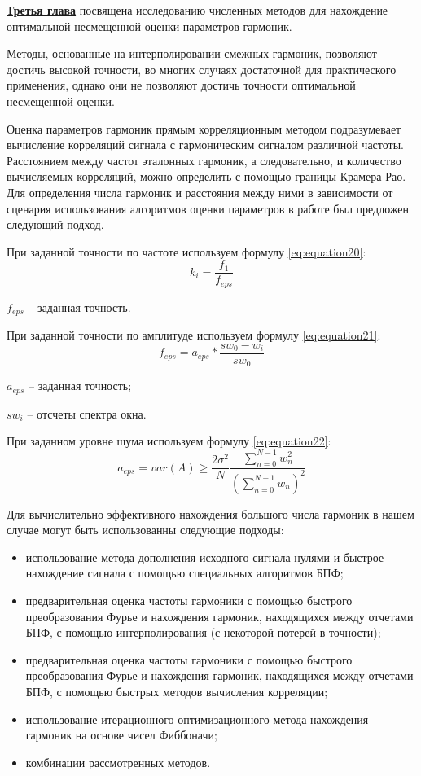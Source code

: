 \underline{\textbf{Третья глава}} посвящена исследованию численных методов для нахождение оптимальной несмещенной оценки параметров гармоник.

Методы, основанные на интерполировании смежных гармоник, позволяют достичь высокой точности, во многих случаях достаточной для практического применения, однако они не позволяют достичь точности оптимальной несмещенной оценки.

Оценка параметров гармоник прямым корреляционным методом подразумевает вычисление корреляций сигнала с гармоническим сигналом различной частоты. Расстоянием между частот эталонных гармоник, а следовательно, и количество вычисляемых корреляций, можно определить с помощью границы Крамера-Рао. Для определения числа гармоник и расстояния между ними в зависимости от сценария использования алгоритмов оценки параметров в работе был предложен следующий подход.

При заданной точности по частоте используем формулу \ref{eq:equation20}:
\begin{equation}
\label{eq:equation20}
k_i=\frac{f_1}{f_{eps}}
\end{equation} 

${f_{eps}}$ -- заданная точность.

При заданной точности по амплитуде используем формулу \ref{eq:equation21}:
\begin{equation}
\label{eq:equation21}
f_{eps}=a_{eps}*\frac{sw_0-w_i}{sw_0} 
\end{equation} 

$a_{eps}$ -- заданная точность;

$sw_i$ -- отсчеты спектра окна.

При заданном уровне шума используем формулу \ref{eq:equation22}:
\begin{equation}
\label{eq:equation22}
a_{eps} = var(A)\geq \frac{2\sigma^2}{N}  \frac{\sum_{n=0}^{N-1}w_n^2}{\left(\sum_{n=0}^{N-1} w_n \right)^2}
\end{equation} 

Для вычислительно эффективного нахождения большого числа гармоник в нашем случае могут быть использованны следующие подходы:
\begin{itemize}
\item использование метода дополнения исходного сигнала нулями и быстрое нахождение сигнала с помощью специальных алгоритмов БПФ;

\item предварительная оценка частоты гармоники с помощью быстрого преобразования Фурье и нахождения гармоник, находящихся между отчетами БПФ, с помощью интерполирования (с некоторой потерей в точности);

\item предварительная оценка частоты гармоники с помощью быстрого преобразования Фурье и нахождения гармоник, находящихся между отчетами БПФ, с помощью быстрых методов вычисления корреляции;

\item использование итерационного оптимизационного метода нахождения гармоник на основе чисел Фиббоначи;
\item комбинации рассмотренных методов.
\end{itemize}

